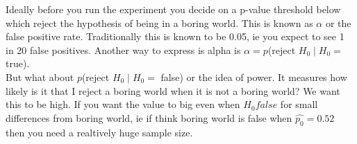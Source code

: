 \noindent
Ideally before you run the experiment you decide on a p-value threshold below which reject the hypothesis of being in a boring world. This is known as $\alpha$ or the false positive rate. Traditionally this is known to be 0.05, ie you expect to see 1 in 20 false positives. Another way to express is alpha is $\alpha = p$(reject $H_0\mid H_0 =$ true). \\

\noindent
But what about $p$(reject $H_0\mid H_0 =$ false) or the idea of power. It measures how likely is it that I reject a boring world when it is not a boring world? We want this to be high. If you want the value to big even when $H_0 false$ for small differences from boring world, ie if think boring world is false when $\hat{p_0} = 0.52$ then you need a realtively huge sample size.
